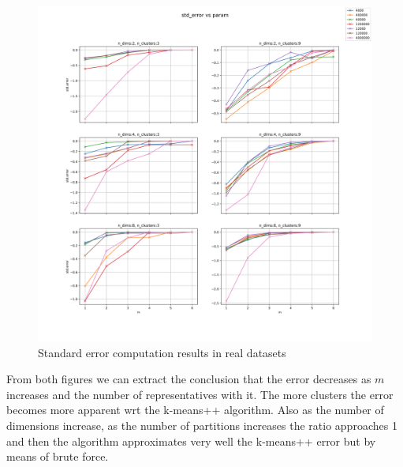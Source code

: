 \begin{figure}[!ht]
    \includegraphics[width=\linewidth]{images/experiments/std_error_real.png}
    \caption{Standard error computation results in real datasets}
    \label{fig:error_real}
\end{figure}

From both figures we can extract the conclusion that the error decreases as $m$ increases and the number of representatives with it. The more clusters the error becomes more apparent wrt the k-means++ algorithm. Also as the number of dimensions increase, as the number of partitions increases the ratio approaches 1 and then the algorithm approximates very well the k-means++ error but by means of brute force.
